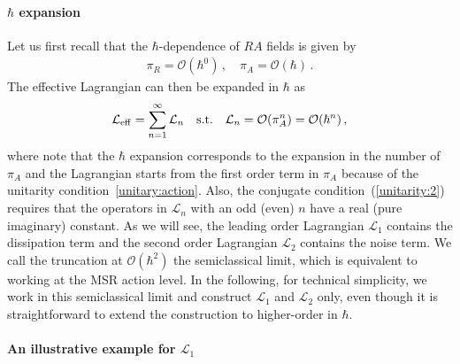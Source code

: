 \documentclass[a4paper,11pt]{article}
\begin{document}
\paragraph{$\hbar$ expansion}
Let us first recall that the $\hbar$-dependence of $RA$ fields is given by
\begin{align}
\pi_R=\mathcal{O}(\hbar^0)\,,
\quad
\pi_A=\mathcal{O}(\hbar)\,.
\end{align}
The effective Lagrangian can then be expanded in $\hbar$ as
\begin{align}
\mathcal{L}_{\rm eff}=\sum_{n=1}^\infty \mathcal{L}_n
\quad
{\rm s.t.}
\quad
\mathcal{L}_n=\mathcal{O}(\pi_A^n)=\mathcal{O}(\hbar^n)\,,
\end{align}
where note that the $\hbar$ expansion corresponds to the expansion 
in the number of $\pi_A$ and the Lagrangian starts from the first order term 
in $\pi_A$ because of the unitarity condition~\eqref{unitary:action}. 
Also, the conjugate condition~(\ref{unitarity:2}) requires that the operators 
in $\mathcal{L}_n$ with an odd (even) $n$ have a real (pure imaginary) constant.
As we will see, the leading order Lagrangian $\mathcal{L}_1$ contains 
the dissipation term and the second order Lagrangian $\mathcal{L}_2$ contains 
the noise term. 
We call the truncation at $\mathcal{O}(\hbar^2)$
the semiclassical limit, which is
equivalent to working at the MSR action level. 
In the following, for technical simplicity, we work in this semiclassical 
limit and construct $\mathcal{L}_1$ and $\mathcal{L}_2$ only, even though 
it is straightforward to extend the construction to higher-order in $\hbar$.

\paragraph{An illustrative example for $\mathcal{L}_1$}
\end{document}
